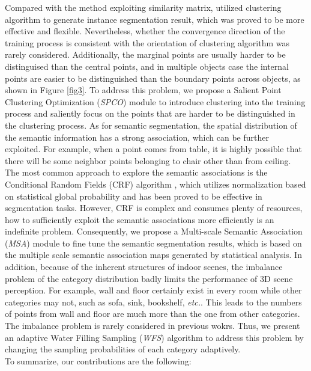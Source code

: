 \documentclass{cta-author}
\begin{document}
Compared with the method \cite{wang2018sgpn} exploiting similarity matrix, \cite{pham2019jsis3d, wang2019associatively} utilized clustering algorithm to generate instance segmentation result, which was proved to be more effective and flexible. Nevertheless, whether the convergence direction of the training process is consistent with the orientation of clustering algorithm was rarely considered. Additionally, the marginal points are usually harder to be distinguised than the central points, and in multiple objects case the internal points are easier to be distinguished than the boundary points across objects, as shown in Figure \ref{fig3}. To address this problem, we propose a Salient Point Clustering Optimization (\textit{SPCO}) module to introduce clustering into the training process and saliently focus on the points that are harder to be distinguished in the clustering process. As for semantic segmentation, the spatial distribution of the semantic information has a strong association, which can be further exploited. For example, when a point comes from table, it is highly possible that there will be some neighbor points belonging to chair other than from ceiling. The most common approach to explore the semantic associations is the Conditional Random Fields (CRF) algorithm \cite{lafferty2001conditional}, which utilizes normalization based on statistical global probability and has been proved to be effective in segmentation tasks. However, CRF is complex and consumes plenty of resources, how to sufficiently exploit the semantic associations more efficiently is an indefinite problem.
Consequently, we propose a Multi-scale Semantic Association (\textit{MSA}) module to fine tune the semantic segmentation results, which is based on the multiple scale semantic association maps generated by statistical analysis. In addition, because of the inherent structures of indoor scenes, the imbalance problem of the category distribution badly limits the performance of 3D scene perception. For example, wall and floor certainly exist in every room while other categories may not, such as sofa, sink, bookshelf, \emph{etc.}. This leads to the numbers of points from wall and floor are much more than the one from other categories. The imbalance problem is rarely considered in previous wokrs. Thus, we present an adaptive Water Filling Sampling (\textit{WFS}) algorithm to address this problem by changing the sampling probabilities of each category adaptively. \\
To summarize, our contributions are the following: 
\end{document}
